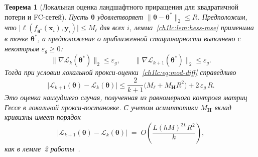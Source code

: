 \documentclass{dissert}
\newtheorem{theorem}{Теорема}
\begin{document}
\begin{theorem}[Локальная оценка ландшафтного приращения для квадратичной потери и FC-сетей]\label{ch1lc:thm:landscape-mse}
Пусть $\boldsymbol{\theta}$ удовлетворяет $\|\boldsymbol{\theta}-\boldsymbol{\theta}^*\|_2\le R$.
Предположим, что $\bigl|\ell(f_{\boldsymbol{\theta}^*}(\mathbf{x}_i),\mathbf{y}_i)\bigr|\le M_{\ell}$ для всех $i$, лемма~\ref{ch1lc:lem:hess-mse} применима в точке $\boldsymbol{\theta}^*$, а предположение о приближенной стационарности выполнено с некоторым $\varepsilon_g\ge 0$:
\[
  \bigl\|\nabla \mathcal{L}_k(\boldsymbol{\theta}^*)\bigr\|_2 \le \varepsilon_g,
  \qquad
  \bigl\|\nabla \mathcal{L}_{k+1}(\boldsymbol{\theta}^*)\bigr\|_2 \le \varepsilon_g .
\]
Тогда при условии локальной прокси-оценки~\eqref{ch1lc:eq:mod-diff} справедливо
\begin{equation}
  \bigl|\mathcal{L}_{k+1}(\boldsymbol{\theta}) - \mathcal{L}_k(\boldsymbol{\theta})\bigr|
  \le \frac{2}{k+1}\bigl( M_{\ell} + M_{\mathbf{H}} R^2 \bigr) + 2\,\varepsilon_g\, R .
\end{equation}
Это оценка наихудшего случая, полученная из равномерного контроля матриц Гессе в локальной прокси-постановке. С учетом асимптотики $M_{\mathbf{H}}$ вклад кривизны имеет порядок
\begin{equation}
  \bigl|\mathcal{L}_{k+1}(\boldsymbol{\theta}) - \mathcal{L}_k(\boldsymbol{\theta})\bigr|
  \;=\; O\!\left(\frac{L(hM)^{2L} R^2}{k}\right),
\end{equation}
как в лемме~2 работы~\cite{grabovoi2024unraveling748584228}.


\end{theorem}
\end{document}
